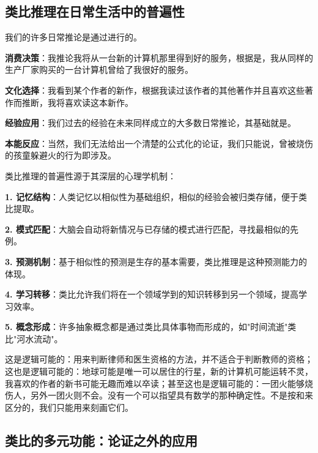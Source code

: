 \subsection{类比推理在日常生活中的普遍性}

我们的许多日常推论是通过进行的。

\begin{examplebox}[title=日常类比推理的典型实例]
\textbf{消费决策}：我推论我将从一台新的计算机那里得到好的服务，根据是，我从同样的生产厂家购买的一台计算机曾给了我很好的服务。

\textbf{文化选择}：我看到某个作者的新作，根据我读过该作者的其他著作并且喜欢这些著作而推断，我将喜欢读这本新作。

\textbf{经验应用}：我们过去的经验在未来同样成立的大多数日常推论，其基础就是。

\textbf{本能反应}：当然，我们无法给出一个清楚的公式化的论证，我们只能说，曾被烧伤的孩童躲避火的行为即涉及。
\end{examplebox}

\begin{theorembox}[title=类比推理的心理学机制]
类比推理的普遍性源于其深层的心理学机制：

\textbf{1. 记忆结构}：人类记忆以相似性为基础组织，相似的经验会被归类存储，便于类比提取。

\textbf{2. 模式匹配}：大脑会自动将新情况与已存储的模式进行匹配，寻找最相似的先例。

\textbf{3. 预测机制}：基于相似性的预测是生存的基本需要，类比推理是这种预测能力的体现。

\textbf{4. 学习转移}：类比允许我们将在一个领域学到的知识转移到另一个领域，提高学习效率。

\textbf{5. 概念形成}：许多抽象概念都是通过类比具体事物而形成的，如"时间流逝"类比"河水流动"。
\end{theorembox}

这是逻辑可能的：用来判断律师和医生资格的方法，并不适合于判断教师的资格；这也是逻辑可能的：地球可能是唯一可以居住的行星，新的计算机可能运转不灵，我喜欢的作者的新书可能无趣而难以卒读；甚至这也是逻辑可能的：一团火能够烧伤人，另外一团火则不会。没有一个可以指望具有数学的那种确定性。不是按和来区分的，我们只能用来刻画它们。

\subsection{类比的多元功能：论证之外的应用}

